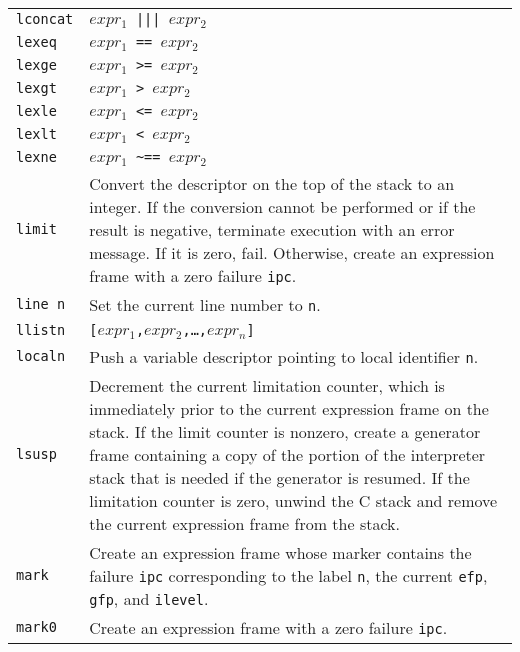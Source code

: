 \begin{xtabular}{l@{\hspace{1.5cm}}p{13.5cm}}
\texttt{lconcat} & \texttt{$expr_1$ ||| $expr_2$}\\

\texttt{lexeq}   & \texttt{$expr_1$ == $expr_2$}\\

\texttt{lexge}   & \texttt{$expr_1$ >= $expr_2$}\\

\texttt{lexgt}   & \texttt{$expr_1$ > $expr_2$}\\

\texttt{lexle}   & \texttt{$expr_1$ <= $expr_2$}\\

\texttt{lexlt}   & \texttt{$expr_1$ < $expr_2$}\\

\texttt{lexne}   & \texttt{$expr_1$ \textasciitilde== $expr_2$}\\

\texttt{limit}   & Convert the descriptor on the top of the stack to an
integer. If the conversion cannot be performed or if the result is
negative, terminate execution with an error message. If it is zero,
fail. Otherwise, create an expression frame with a zero failure \texttt{ipc}.\\

\texttt{line n}  & Set the current line number to \texttt{n}.\\

\texttt{llistn } & \texttt{[$expr_1$,$expr_2$,\dots,$expr_n$]}\\

\texttt{localn } & Push a variable descriptor pointing to local identifier \texttt{n}.\\

\texttt{lsusp}   & Decrement the current limitation counter, which is
immediately prior to the current expression frame on the stack. If the
limit counter is nonzero, create a generator frame containing a copy
of the portion of the interpreter stack that is needed if the
generator is resumed. If the limitation counter is zero, unwind the C
stack and remove the current expression frame from the stack.\\

\texttt{mark}    & Create an expression frame whose marker contains the failure
\texttt{ipc} corresponding to the label \texttt{n}, the current \texttt{efp},
\texttt{gfp}, and \texttt{ilevel}.\\


\texttt{mark0}   & Create an expression frame with a zero failure \texttt{ipc}.\\


\end{xtabular}
